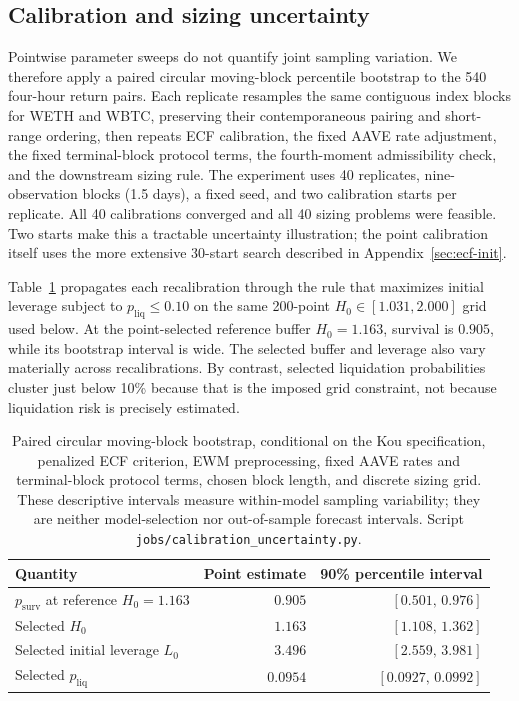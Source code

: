 \clearpage
\subsection{Calibration and sizing uncertainty}\label{sec:calibration-uncertainty}

Pointwise parameter sweeps do not quantify joint sampling variation. We therefore apply a
paired circular moving-block percentile bootstrap to the 540 four-hour return pairs. Each
replicate resamples the same contiguous index blocks for WETH and WBTC, preserving their
contemporaneous pairing and short-range ordering, then repeats ECF calibration, the fixed
AAVE rate adjustment, the fixed terminal-block protocol terms, the fourth-moment admissibility check, and the downstream sizing
rule. The experiment uses 40 replicates, nine-observation blocks (1.5 days), a fixed seed,
and two calibration starts per replicate. All 40 calibrations converged and all 40 sizing
problems were feasible. Two starts make this a tractable uncertainty illustration; the
point calibration itself uses the more extensive 30-start search described in
Appendix~\ref{sec:ecf-init}.

Table~\ref{tab:bootstrap-uncertainty} propagates each recalibration through the rule that
maximizes initial leverage subject to $p_{\mathrm{liq}}\leq0.10$ on the same 200-point
$H_0\in[1.031,2.000]$ grid used below. At the point-selected reference buffer
$H_0=1.163$, survival is $0.905$, while its bootstrap interval is wide. The selected buffer
and leverage also vary materially across recalibrations. By contrast, selected liquidation
probabilities cluster just below 10\% because that is the imposed grid constraint, not
because liquidation risk is precisely estimated.

\begin{table}[ht]
\centering\small
\renewcommand{\arraystretch}{1.2}
\begin{tabular}{lrr}
\toprule
Quantity & Point estimate & 90\% percentile interval \\
\midrule
$p_{\mathrm{surv}}$ at reference $H_0=1.163$ & $0.905$ & $[0.501,\,0.976]$ \\
Selected $H_0$ & $1.163$ & $[1.108,\,1.362]$ \\
Selected initial leverage $L_0$ & $3.496$ & $[2.559,\,3.981]$ \\
Selected $p_{\mathrm{liq}}$ & $0.0954$ & $[0.0927,\,0.0992]$ \\
\bottomrule
\end{tabular}
\caption{Paired circular moving-block bootstrap, conditional on the Kou specification,
penalized ECF criterion, EWM preprocessing, fixed AAVE rates and terminal-block protocol terms, chosen
block length, and discrete sizing grid. These descriptive intervals measure within-model
sampling variability; they are neither model-selection nor out-of-sample forecast
intervals. Script \texttt{jobs/calibration\_uncertainty.py}.}
\label{tab:bootstrap-uncertainty}
\end{table}

\clearpage
